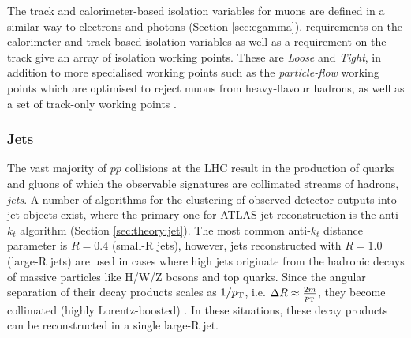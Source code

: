 The track and calorimeter-based isolation variables for muons are defined in a similar way to electrons and photons (Section \ref{sec:egamma}). \pt requirements on the calorimeter and track-based isolation variables as well as a requirement on the track \pt give an array of isolation working points. These are \textit{Loose} and \textit{Tight}, in addition to more specialised working points such as the \textit{particle-flow} working points which are optimised to reject muons from heavy-flavour hadrons, as well as a set of track-only working points \cite{Buckley:PCP,Atlas:muonreco}.

\subsubsection{Jets\label{sec:atlas:jets}}
The vast majority of $pp$ collisions at the LHC result in the production of quarks and gluons of which the observable signatures are collimated streams of hadrons, \textit{jets}. A number of algorithms for the clustering of observed detector outputs into jet objects exist, where the primary one for ATLAS jet reconstruction is the anti-$k_t$ algorithm (Section \ref{sec:theory:jet}). The most common anti-$k_t$ distance parameter is $R=0.4$ (small-R jets), however, jets reconstructed with $R=1.0$ (large-R jets) are used in cases where high \pt jets originate from the hadronic decays of massive particles like H/W/Z bosons and top quarks. Since the angular separation of their decay products scales as $1/p_{\text{T}}$, i.e. $\Delta R\approx\frac{2m}{p_{\text{T}}}$, they become collimated (highly Lorentz-boosted) \cite{Atlas:altinputsjetgrooming}. In these situations, these decay products can be reconstructed in a single large-R jet.

